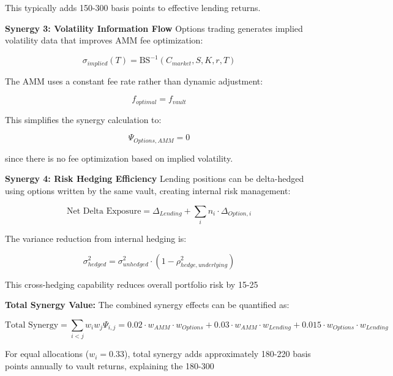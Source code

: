 \documentclass[12pt]{article}
\begin{document}
This typically adds 150-300 basis points to effective lending returns.

\textbf{Synergy 3: Volatility Information Flow}
Options trading generates implied volatility data that improves AMM fee optimization:

\begin{equation}
\sigma_{implied}(T) = \text{BS}^{-1}(C_{market}, S, K, r, T)
\end{equation}

The AMM uses a constant fee rate rather than dynamic adjustment:

\begin{equation}
f_{optimal} = f_{vault}
\end{equation}

This simplifies the synergy calculation to:

\begin{equation}
\Psi_{Options,AMM} = 0
\end{equation}

since there is no fee optimization based on implied volatility.

\textbf{Synergy 4: Risk Hedging Efficiency}
Lending positions can be delta-hedged using options written by the same vault, creating internal risk management:

\begin{equation}
\text{Net Delta Exposure} = \Delta_{Lending} + \sum_i n_i \cdot \Delta_{Option,i}
\end{equation}

The variance reduction from internal hedging is:

\begin{equation}
\sigma^2_{hedged} = \sigma^2_{unhedged} \cdot \left(1 - \rho^2_{hedge,underlying}\right)
\end{equation}

This cross-hedging capability reduces overall portfolio risk by 15-25%

\textbf{Total Synergy Value:}
The combined synergy effects can be quantified as:

\begin{equation}
\text{Total Synergy} = \sum_{i<j} w_i w_j \Psi_{i,j} = 0.02 \cdot w_{AMM} \cdot w_{Options} + 0.03 \cdot w_{AMM} \cdot w_{Lending} + 0.015 \cdot w_{Options} \cdot w_{Lending}
\end{equation}

For equal allocations ($w_i = 0.33$), total synergy adds approximately 180-220 basis points annually to vault returns, explaining the 180-300%
\end{document}
